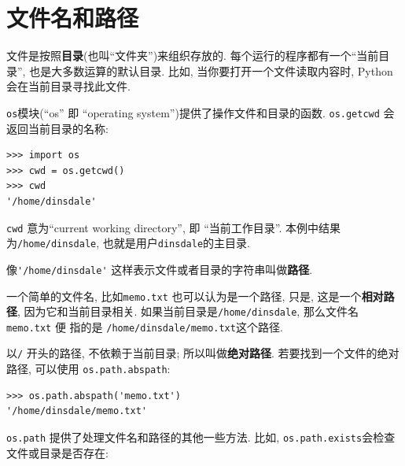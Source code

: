 \documentclass[10pt]{book}
\begin{document}



\section{文件名和路径}
\label{paths}

文件是按照{\bf 目录}(也叫``文件夹'')来组织存放的. 
每个运行的程序都有一个``当前目录'', 也是大多数运算的默认目录. 
比如, 当你要打开一个文件读取内容时, Python会在当前目录寻找此文件. 

{\tt os}模块(``os'' 即 ``operating system'')提供了操作文件和目录的函数. 
{\tt os.getcwd} 会返回当前目录的名称:

\begin{verbatim}
>>> import os
>>> cwd = os.getcwd()
>>> cwd
'/home/dinsdale'
\end{verbatim}
%
{\tt cwd} 意为``current working directory'', 即 ``当前工作目录''. 
本例中结果为{\tt /home/dinsdale}, 也就是用户{\tt dinsdale}的主目录. 

像\verb"'/home/dinsdale'" 这样表示文件或者目录的字符串叫做{\bf 路径}. 

一个简单的文件名, 比如{\tt memo.txt} 也可以认为是一个路径, 
只是, 这是一个{\bf 相对路径}, 因为它和当前目录相关. 
如果当前目录是{\tt /home/dinsdale}, 那么文件名{\tt memo.txt} 便
指的是 {\tt /home/dinsdale/memo.txt}这个路径. 
 
 

以{\tt /} 开头的路径, 不依赖于当前目录;
所以叫做{\bf 绝对路径}.
若要找到一个文件的绝对路径, 可以使用 {\tt os.path.abspath}:

\begin{verbatim}
>>> os.path.abspath('memo.txt')
'/home/dinsdale/memo.txt'
\end{verbatim}
%
{\tt os.path} 提供了处理文件名和路径的其他一些方法. 
比如, {\tt os.path.exists}会检查文件或目录是否存在:
\end{document}
